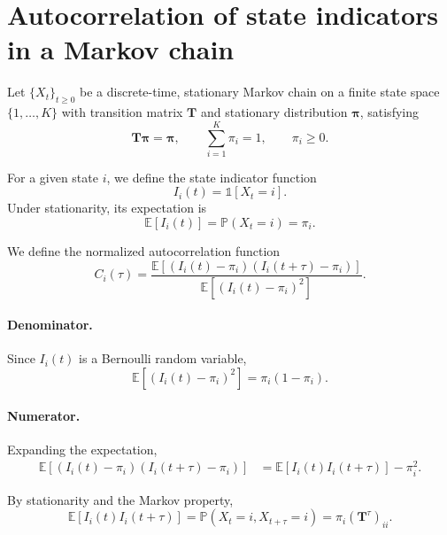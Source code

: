 \documentclass[11pt]{article}
\begin{document}
\section{Autocorrelation of state indicators in a Markov chain}

Let $\{X_t\}_{t\ge 0}$ be a discrete-time, stationary Markov chain on a finite
state space $\{1,\dots,K\}$ with transition matrix $\mathbf{T}$ and stationary
distribution $\boldsymbol{\pi}$, satisfying
\begin{equation}
    \mathbf{T}\boldsymbol{\pi} = \boldsymbol{\pi},
    \qquad
    \sum_{i=1}^K \pi_i = 1,
    \qquad
    \pi_i \ge 0.
\end{equation}

For a given state $i$, we define the state indicator function
\begin{equation}
    I_i(t) = \mathbb{1}[X_t = i].
\end{equation}
Under stationarity, its expectation is
\begin{equation}
    \mathbb{E}[I_i(t)] = \mathbb{P}(X_t = i) = \pi_i.
\end{equation}

We define the normalized autocorrelation function
\begin{equation}
    C_i(\tau)
    =
    \frac{
        \mathbb{E}\!\left[(I_i(t)-\pi_i)(I_i(t+\tau)-\pi_i)\right]
    }{
        \mathbb{E}\!\left[(I_i(t)-\pi_i)^2\right]
    }.
\end{equation}

\paragraph{Denominator.}
Since $I_i(t)$ is a Bernoulli random variable,
\begin{equation}
    \mathbb{E}\!\left[(I_i(t)-\pi_i)^2\right]
    = \pi_i(1-\pi_i).
\end{equation}

\paragraph{Numerator.}
Expanding the expectation,
\begin{equation}
\begin{aligned}
    \mathbb{E}\!\left[(I_i(t)-\pi_i)(I_i(t+\tau)-\pi_i)\right]
    &=
    \mathbb{E}[I_i(t)I_i(t+\tau)] - \pi_i^2.
\end{aligned}
\end{equation}

By stationarity and the Markov property,
\begin{equation}
    \mathbb{E}[I_i(t)I_i(t+\tau)]
    =
    \mathbb{P}(X_t=i, X_{t+\tau}=i)
    =
    \pi_i (\mathbf{T}^\tau)_{ii}.
\end{equation}
\end{document}
